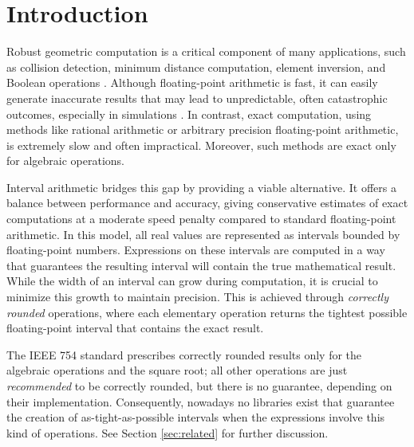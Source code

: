 
\section{Introduction}
\label{sec:introduction}
Robust geometric computation is a critical component of many applications, such as collision detection, minimum distance computation, element inversion, and Boolean operations \cite{something}. Although floating-point arithmetic is fast, it can easily generate inaccurate results that may lead to unpredictable, often catastrophic outcomes, especially in simulations \cite{something}. In contrast, exact computation, using methods like rational arithmetic or arbitrary precision floating-point arithmetic, is extremely slow and often impractical.
Moreover, such methods are exact only for algebraic operations. 

Interval arithmetic bridges this gap by providing a viable alternative. 
It offers a balance between performance and accuracy, giving conservative estimates of exact computations at a moderate speed penalty compared to standard floating-point arithmetic. In this model, all real values are represented as intervals bounded by floating-point numbers. Expressions on these intervals are computed in a way that guarantees the resulting interval will contain the true mathematical result.
While the width of an interval can grow during computation, it is crucial to minimize this growth to maintain precision. This is achieved through \emph{correctly rounded} operations, where each elementary operation returns the tightest possible floating-point interval that contains the exact result.

The IEEE 754 standard prescribes correctly rounded results only for the algebraic operations and the square root; all other 
operations are just \emph{recommended} to be correctly rounded, but there is no guarantee, depending on their implementation.
Consequently, nowadays no libraries exist that guarantee the creation of as-tight-as-possible intervals when the expressions involve this kind of operations.
See Section \ref{sec:related} for further discussion.

